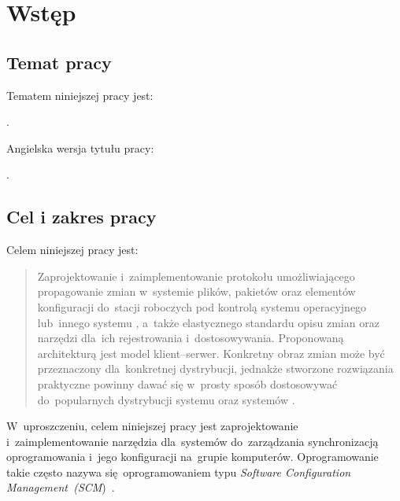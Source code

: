 \documentclass[thesis]{subfiles}
\makeatletter
\let\inserttitle\@title
\let\inserttitleaux\@titleaux
\makeatother
\begin{document}
\chapter{Wstęp}
\label{chapter:intro}


\section{Temat pracy}

\noindent Tematem niniejszej pracy jest:
\begin{displayquote}
\inserttitle.
\end{displayquote}
Angielska wersja tytułu pracy:
\begin{displayquote}
\inserttitleaux.
\end{displayquote}


\section{Cel i zakres pracy}
\label{cel-i-zakres}

\noindent Celem niniejszej pracy jest:
\blockcquote{formularz-zgloszenia-pracy}{Zaprojektowanie i~zaimplementowanie protokołu umożliwiającego propagowanie zmian w~systemie plików, pakietów oraz elementów konfiguracji do~stacji roboczych pod kontrolą systemu operacyjnego  lub~innego systemu , a~także elastycznego standardu opisu zmian oraz narzędzi dla~ich rejestrowania i~dostosowywania. Proponowaną architekturą jest model klient--serwer. Konkretny obraz zmian może być przeznaczony dla~konkretnej dystrybucji, jednakże stworzone rozwiązania praktyczne powinny dawać się w~prosty sposób dostosowywać do~popularnych dystrybucji systemu  oraz systemów .}
W~uproszczeniu, celem niniejszej pracy jest zaprojektowanie i~zaimplementowanie narzędzia dla~systemów  do~zarządzania synchronizacją oprogramowania i~jego konfiguracji na~grupie komputerów. Oprogramowanie takie często nazywa się~oprogramowaniem typu \emph{Software Configuration Management~(SCM})~\cite{wiki:scm}.

\end{document}

